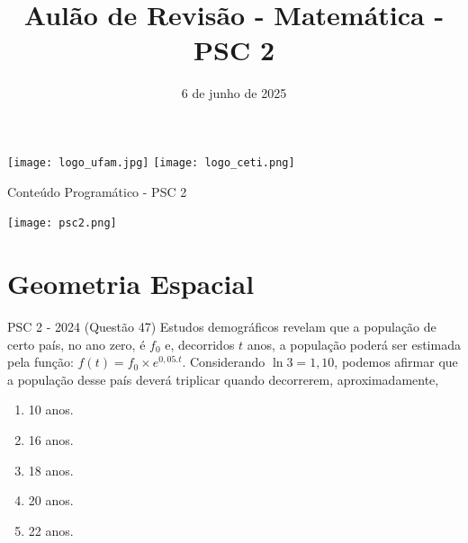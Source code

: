 \documentclass[aspectratio=169]{beamer}
\title[CETi Gilberto Mestrinho]{Aulão de Revisão - Matemática - PSC 2}
\date{6 de junho de 2025}
\newif\ifusarcorvermelha
\newcommand{\vermelho}[1]{%
    \ifusarcorvermelha
        {\color{red}#1}%
    \else
        #1%
    \fi
}
\begin{document}
\justifying
\onehalfspacing

\begin{frame}
    \begin{titlepage}
    \centering
    \vspace*{1cm} %
    
    \noindent%
    \hspace*{0.3\paperwidth}%
    \texttt{[image: logo\_ufam.jpg]}%
    \hfill%
    \texttt{[image: logo\_ceti.png]}%
    \hspace*{0.3\paperwidth}%
    
    \vspace{0.1cm} %

    \vspace{1cm}
    
    \vfill %
    \end{titlepage}
\end{frame}

\begin{frame}{Conteúdo Programático - PSC 2}

    \begin{center}
        \texttt{[image: psc2.png]}
    \end{center}
    
\end{frame}

\section{Geometria Espacial}

    \begin{frame}{PSC 2 - 2024 (Questão 47)}
        Estudos demográficos revelam que a população de certo país, no ano zero, é $f_{0}$ e, decorridos $t$ anos, a população poderá ser estimada pela função: $f(t)=f_{0} \times  e^{0,05 . t}$. Considerando $\ln{3}=1,10$, podemos afirmar que a população desse país deverá triplicar quando decorrerem, aproximadamente,

            \begin{enumerate}[a]
                \item 10 anos.
                \item 16 anos.
                \item 18 anos.
                \item 20 anos.
                \item \vermelho{22 anos.} %
            \end{enumerate}
            
    \end{frame}
\end{document}
